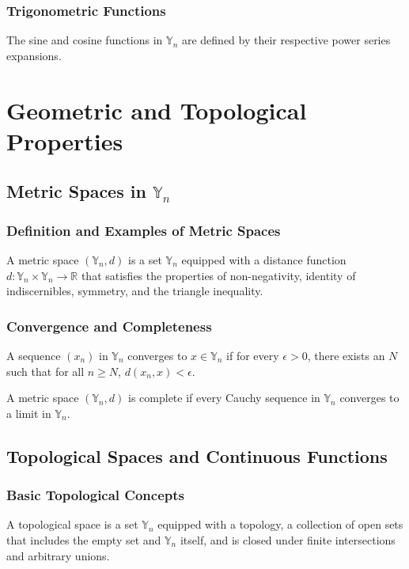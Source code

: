 \documentclass[12pt]{book}
\begin{document}
\subsection{Trigonometric Functions}
\begin{definition}
The sine and cosine functions in $\mathbb{Y}_n$ are defined by their respective power series expansions.
\end{definition}

\chapter{Geometric and Topological Properties}
\section{Metric Spaces in $\mathbb{Y}_n$}
\subsection{Definition and Examples of Metric Spaces}
\begin{definition}
A metric space $(\mathbb{Y}_n, d)$ is a set $\mathbb{Y}_n$ equipped with a distance function $d: \mathbb{Y}_n \times \mathbb{Y}_n \to \mathbb{R}$ that satisfies the properties of non-negativity, identity of indiscernibles, symmetry, and the triangle inequality.
\end{definition}
\subsection{Convergence and Completeness}
\begin{theorem}
A sequence $(x_n)$ in $\mathbb{Y}_n$ converges to $x \in \mathbb{Y}_n$ if for every $\epsilon > 0$, there exists an $N$ such that for all $n \geq N$, $d(x_n, x) < \epsilon$.
\end{theorem}
\begin{theorem}
A metric space $(\mathbb{Y}_n, d)$ is complete if every Cauchy sequence in $\mathbb{Y}_n$ converges to a limit in $\mathbb{Y}_n$.
\end{theorem}

\section{Topological Spaces and Continuous Functions}
\subsection{Basic Topological Concepts}
\begin{definition}
A topological space is a set $\mathbb{Y}_n$ equipped with a topology, a collection of open sets that includes the empty set and $\mathbb{Y}_n$ itself, and is closed under finite intersections and arbitrary unions.
\end{definition}
\end{document}

